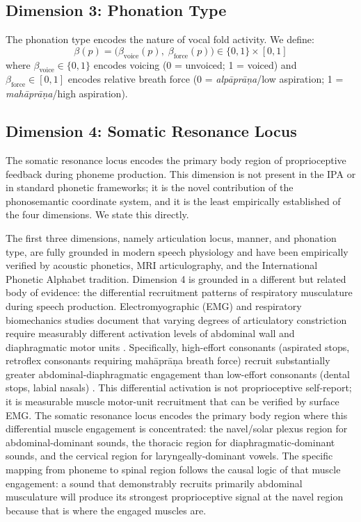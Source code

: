 \documentclass[12pt]{article}
\begin{document}
\subsection{Dimension 3: Phonation Type}

The phonation type encodes the nature of vocal fold activity. We define:
\[
\beta(p) = \bigl(\beta_\text{voice}(p),\; \beta_\text{force}(p)\bigr) \in \{0,1\} \times [0,1]
\]
where $\beta_\text{voice} \in \{0,1\}$ encodes voicing (0 = unvoiced; 1 = voiced) and $\beta_\text{force} \in [0,1]$ encodes relative breath force (0 = \textit{alp\={a}pr\={a}\d{n}a}/low aspiration; 1 = \textit{mah\={a}pr\={a}\d{n}a}/high aspiration).

\subsection{Dimension 4: Somatic Resonance Locus}

The somatic resonance locus encodes the primary body region of proprioceptive feedback during phoneme production. This dimension is not present in the IPA or in standard phonetic frameworks; it is the novel contribution of the phonosemantic coordinate system, and it is the least empirically established of the four dimensions. We state this directly.

The first three dimensions, namely articulation locus, manner, and phonation type, are fully grounded in modern speech physiology and have been empirically verified by acoustic phonetics, MRI articulography, and the International Phonetic Alphabet tradition. Dimension 4 is grounded in a different but related body of evidence: the differential recruitment patterns of respiratory musculature during speech production. Electromyographic (EMG) and respiratory biomechanics studies document that varying degrees of articulatory constriction require measurably different activation levels of abdominal wall and diaphragmatic motor units \cite{sundberg1987, zemlin1998}. Specifically, high-effort consonants (aspirated stops, retroflex consonants requiring mahāprāṇa breath force) recruit substantially greater abdominal-diaphragmatic engagement than low-effort consonants (dental stops, labial nasals) \cite{titze1994}. This differential activation is not proprioceptive self-report; it is measurable muscle motor-unit recruitment that can be verified by surface EMG. The somatic resonance locus encodes the primary body region where this differential muscle engagement is concentrated: the navel/solar plexus region for abdominal-dominant sounds, the thoracic region for diaphragmatic-dominant sounds, and the cervical region for laryngeally-dominant vowels. The specific mapping from phoneme to spinal region follows the causal logic of that muscle engagement: a sound that demonstrably recruits primarily abdominal musculature will produce its strongest proprioceptive signal at the navel region because that is where the engaged muscles are.
\end{document}
